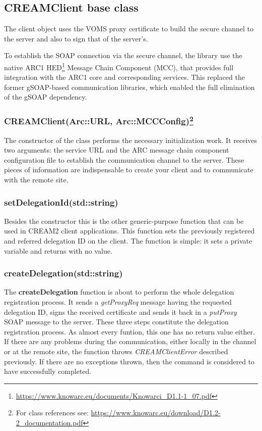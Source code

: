 \documentclass{article}
\begin{document}
\subsection{CREAMClient base class}
\label{CREAMClient}
The client object uses the VOMS proxy certificate to build the secure channel to the server and also to sign that of the server's.\par
To establish the SOAP connection via the secure channel, the library use the native ARC1 HED\footnote{\url{https://www.knowarc.eu/documents/Knowarci\_D1.1-1\_07.pdf}} Message Chain Component (MCC), that provides full integration with the ARC1 core and corresponding services. This replaced the former gSOAP-based\cite{gsoap} communication libraries, which enabled the full elimination of the gSOAP dependency.
\subsubsection*{CREAMClient(Arc::URL, Arc::MCCConfig)\footnote{For class references see: \url{https://www.knowarc.eu/download/D1.2-2\_documentation.pdf}}}
The constructor of the class performs the necessary initialization work. It receives two arguments: the service URL and the ARC message chain component configuration file to establish the communication channel to the server. These pieces of information are indispensable to create your client and to communicate with the remote site.
\subsubsection*{setDelegationId(std::string)}
Besides the constructor this is the other generic-purpose function that can be used in CREAM2 client applications. This function sets the previously registered and referred delegation ID on the client. The function is simple: it sets a private variable and returns with no value.
\subsubsection*{createDelegation(std::string)}
The \textbf{createDelegation} function is about to perform the whole delegation registration process. It sends a \textit{getProxyReq} message having the requested delegation ID, signs the received certificate and sends it back in a \textit{putProxy} SOAP message to the server. These three steps constitute the delegation registration process.
As almost every funtion, this one has no return value either. If there are any problems during the communication, either locally in the channel or at the remote site, the function throws \textit{CREAMClientError} described previously. If there are no exceptions thrown, then the command is considered to have successfully completed.
\end{document}
